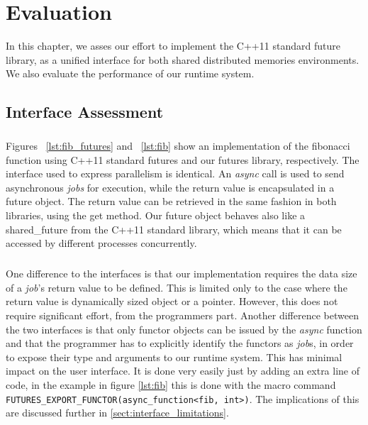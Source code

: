 \chapter{Evaluation}
\label{chap:evaluation}
	In this chapter, we asses our effort to implement the C++11 standard future library, as 
a unified interface for both shared distributed memories environments.  We also evaluate the performance of our runtime system.

\section{Interface Assessment}
\label{sect:interface_assesment}

\paragraph{}
Figures ~\ref{lst:fib_futures} and ~\ref{lst:fib} show an implementation of the fibonacci function using
C++11 standard futures and our futures library, respectively.  The interface used to express parallelism is
identical.  An \emph{async} call is used to send asynchronous \emph{jobs} for execution, while the return value
is encapsulated in a future object.  The return value can be retrieved in the same fashion in both libraries, 
using the get method.  Our future object behaves also like a shared\_future from the C++11 standard library,
which means that it can be accessed by different processes concurrently.  

\paragraph{}
One difference to the interfaces is that our implementation requires the data size of a \emph{job}'s return 
value to be defined.  This is limited only to the case where the return value is dynamically sized object
or a pointer.  However, this does not require significant effort, from the programmers part.
Another  difference between the two interfaces is that only functor objects can be 
issued by the \emph{async} function and that the programmer has to explicitly identify the functors
as \emph{job}s, in order to expose their type and arguments to our runtime system.  This has minimal impact on
the user interface.  It is done very easily just by adding an extra line of code, in the example in figure 
\ref{lst:fib} this is done with the macro command \texttt{FUTURES\_EXPORT\_FUNCTOR(async\_function<fib, int>)}.  
The implications of this are discussed further in \ref{sect:interface_limitations}.  

